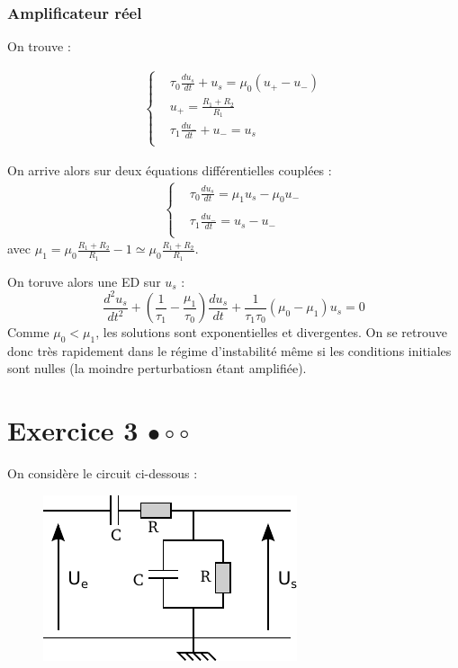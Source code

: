 \documentclass{report}
\begin{document}
\subsubsection{Amplificateur réel}

On trouve :

\begin{align*}
	\left\lbrace
\begin{array}{cc}
	& \tau_0\frac{du_s}{dt} +u_s = \mu_0(u_+-u_-) \\
	&  u_+=\frac{R_1+R_2}{R_1}\\
	&\tau_1\frac{du_-}{dt} +u_- =u_s  \\
\end{array}\right.
\end{align*}

On arrive alors sur deux équations différentielles couplées :
\begin{align*}
	\left\lbrace
\begin{array}{cc}
	& \tau_0\frac{du_s}{dt} = \mu_1u_s - \mu_0u_- \\
	&  \\
	&\tau_1\frac{du_-}{dt} = u_s - u_-  \\
\end{array}\right.
\end{align*}
avec $\mu_1=\mu_0\frac{R_1+R_2}{R_1}-1\simeq\mu_0\frac{R_1+R_2}{R_1}$.

On toruve alors une ED sur $u_s$ :
\begin{equation}
	\frac{d^2u_s}{dt^2} +\left( \frac{1}{\tau_1}-\frac{\mu_1}{\tau_0}\right) \frac{du_s}{dt} + \frac{1}{\tau_1\tau_0}\left(\mu_0-\mu_1\right)u_s=0
\end{equation}
Comme $\mu_0<\mu_1$, les solutions sont exponentielles et divergentes. On se retrouve donc très rapidement dans le régime d'instabilité même si les conditions initiales sont nulles (la moindre perturbatiosn étant amplifiée).

\newpage

\section*{Exercice 3 $\bullet\circ\circ$}

On considère le circuit ci-dessous :

\begin{figure}[!h]
\centering
\includegraphics[width=0.5\linewidth]{circuit_1.pdf}
\end{figure}
\end{document}
